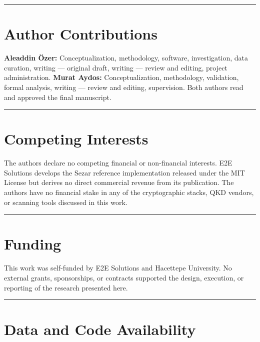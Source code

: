 \begin{center}\rule{0.5\linewidth}{0.5pt}\end{center}

\section{Author Contributions}\label{author-contributions}

\textbf{Aleaddin Özer:} Conceptualization, methodology, software,
investigation, data curation, writing --- original draft, writing ---
review and editing, project administration. \textbf{Murat Aydos:}
Conceptualization, methodology, validation, formal analysis, writing ---
review and editing, supervision. Both authors read and approved the
final manuscript.

\begin{center}\rule{0.5\linewidth}{0.5pt}\end{center}

\section{Competing Interests}\label{competing-interests}

The authors declare no competing financial or non-financial interests.
E2E Solutions develops the Sezar reference implementation released under
the MIT License but derives no direct commercial revenue from its
publication. The authors have no financial stake in any of the
cryptographic stacks, QKD vendors, or scanning tools discussed in this
work.

\begin{center}\rule{0.5\linewidth}{0.5pt}\end{center}

\section{Funding}\label{funding}

This work was self-funded by E2E Solutions and Hacettepe University. No
external grants, sponsorships, or contracts supported the design,
execution, or reporting of the research presented here.

\begin{center}\rule{0.5\linewidth}{0.5pt}\end{center}

\section{Data and Code Availability}\label{data-and-code-availability}

